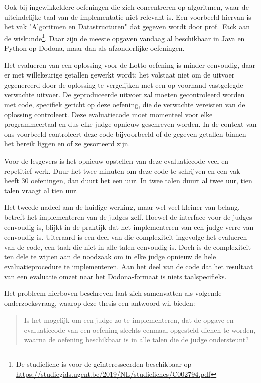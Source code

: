 Ook bij ingewikkeldere oefeningen die zich concentreren op algoritmen, waar de uiteindelijke taal van de implementatie niet relevant is.
Een voorbeeld hiervan is het vak "Algoritmen en Datastructuren" dat gegeven wordt door prof.\ Fack aan de wiskunde\footnote{De studiefiche is voor de geïnteresseerden beschikbaar op \url{https://studiegids.ugent.be/2019/NL/studiefiches/C002794.pdf}}.
Daar zijn de meeste opgaven vandaag al beschikbaar in Java en Python op Dodona, maar dan als afzonderlijke oefeningen.

Het evalueren van een oplossing voor de Lotto-oefening is minder eenvoudig, daar er met willekeurige getallen gewerkt wordt: het volstaat niet om de uitvoer gegenereerd door de oplossing te vergelijken met een op voorhand vastgelegde verwachte uitvoer.
De geproduceerde uitvoer zal moeten gecontroleerd worden met code, specifiek gericht op deze oefening, die de verwachte vereisten van de oplossing controleert.
Deze evaluatiecode moet momenteel voor elke programmeertaal en dus elke judge opnieuw geschreven worden.
In de context van ons voorbeeld controleert deze code bijvoorbeeld of de gegeven getallen binnen het bereik liggen en of ze gesorteerd zijn.

Voor de lesgevers is het opnieuw opstellen van deze evaluatiecode veel en repetitief werk.
Duur het twee minuten om deze code te schrijven en een vak heeft 30 oefeningen, dan duurt het een uur.
In twee talen duurt al twee uur, tien talen vraagt al tien uur.

Het tweede nadeel aan de huidige werking, maar wel veel kleiner van belang, betreft het implementeren van de judges zelf.
Hoewel de interface voor de judges eenvoudig is, blijkt in de praktijk dat het implementeren van een judge verre van eenvoudig is.
Uiteraard is een deel van die complexiteit ingevolge het evalueren van de code, een taak die niet in alle talen eenvoudig is.
Doch is de complexiteit ten dele te wijten aan de noodzaak om in elke judge opnieuw de hele evaluatieprocedure te implementeren.
Aan het deel van de code dat het resultaat van een evaluatie omzet naar het Dodona-formaat is niets taalspecifieks.

Het probleem hierboven beschreven laat zich samenvatten als volgende onderzoeksvraag, waarop deze thesis een antwoord wil bieden:

\begin{quote}
    Is het mogelijk om een judge zo te implementeren, dat de opgave en evaluatiecode van een oefening slechts eenmaal opgesteld dienen te worden, waarna de oefening beschikbaar is in alle talen die de judge ondersteunt?
\end{quote}

